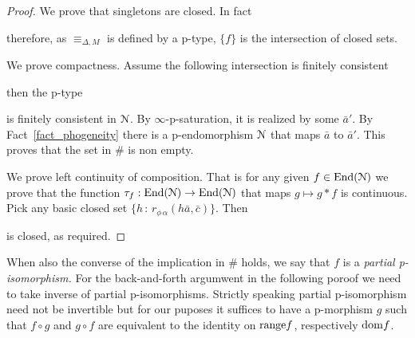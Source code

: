 \begin{proof}
  We prove that singletons are closed.
  In fact


  therefore, as $\equiv_{\Delta,M}$ is defined by a p-type, $\{f\}$ is the intersection of closed sets.
  
  We prove compactness.
  Assume the following intersection is finitely consistent


  then the p-type


  is finitely consistent in $\EuScript N$.
  By $\infty$-p-saturation, it is realized by some $\bar a'$.
  By Fact~\ref{fact_phogeneity} there is a p-endomorphism $\EuScript N$ that maps $\bar a$ to $\bar a'$.
  This proves that the set in $\#$ is non empty.

  We prove left continuity of composition.
  That is for any given $f\in{\rm End}(\EuScript N)$ we prove that the function $\tau_f:{\rm End}(\EuScript N)\to{\rm End}(\EuScript N)$ that maps $g\mapsto g*f$ is continuous.
  Pick any basic closed set $\{h\, :\, r_{\phi\,\alpha}(h\bar a,\bar c)\}$.
  Then 
  
  
  is closed, as required.
\end{proof}

When also the converse of the implication in \# holds, we say that $f$ is a \emph{partial p-isomorphism.}
For the back-and-forth argumwent in the following poroof we need to take inverse of partial p-isomorphisms.
Strictly speaking partial p-isomorphism need not be invertible but for our puposes it suffices to have a p-morphism $g$ such that $f\circ g$ and $g\circ f$ are equivalent to the identity on ${\rm range}f$, respectively ${\rm dom}f$. 



